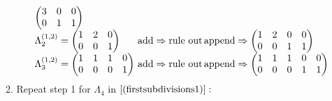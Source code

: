 \[{\begin{array}{lll}
\begin{pmatrix}
3 & 0 & 0 \\
0 & 1 & 1
\end{pmatrix} \\
\Lambda^{(1,2)}_2 = \begin{pmatrix}
1 & 2 & 0\\
0 & 0 & 1
\end{pmatrix} & \!\!\!\!\hbox{add} \Rightarrow \hbox{rule out} &  \!\!\!\!\!\hbox{append} \Rightarrow \begin{pmatrix}
1 & 2 & 0 & 0\\
0 & 0 & 1 & 1
\end{pmatrix} \\
\Lambda^{(1,2)}_3 = \begin{pmatrix}
1 & 1 & 1 & 0\\
0 & 0 & 0 & 1
\end{pmatrix} & \!\!\!\!\hbox{add} \Rightarrow \hbox{rule out} & \!\!\!\!\! \hbox{append} \Rightarrow \begin{pmatrix}
1 & 1 & 1 & 0 & 0\\
0 & 0 & 0 & 1 & 1
\end{pmatrix}
\end{array}}\] 2. Repeat step 1 for \(\Lambda_4\) in
\(\eqref{(firstsubdivisions1)}:\)\\
